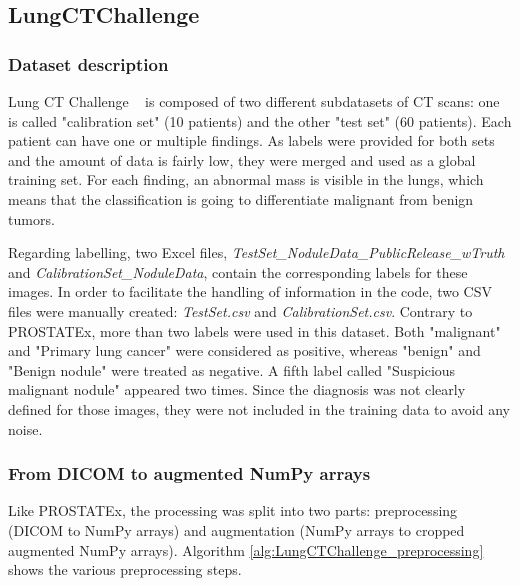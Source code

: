 \subsection{LungCTChallenge}
\label{sec:lungCTChallenge}
\subsubsection{Dataset description}
\setlength{\marginparwidth}{3cm}\leavevmode {}Lung CT Challenge ~\cite{12, 36, 38} is composed of two different subdatasets of CT scans: one is called "calibration set" (10 patients) and the other "test set" (60 patients). Each patient can have one or multiple findings. As labels were provided for both sets and the amount of data is fairly low, they were merged and used as a global training set. For each finding, an abnormal mass is visible in the lungs, which means that the classification is going to differentiate malignant from benign tumors.

Regarding labelling, two Excel files, \textit{TestSet\_NoduleData\_PublicRelease\_wTruth} and \textit{CalibrationSet\_NoduleData}, contain the corresponding labels for these images. In order to facilitate the handling of information in the code, two CSV files were manually created: \mbox{\textit{TestSet.csv}} and \textit{CalibrationSet.csv}.
Contrary to PROSTATEx, more than two labels were used in this dataset. Both "malignant" and "Primary lung cancer" were considered as positive, whereas "benign" and "Benign nodule" were treated as negative. A fifth label called "Suspicious malignant nodule" appeared two times. Since the diagnosis was not clearly defined for those images, they were not included in the training data to avoid any noise. 


\subsubsection{From DICOM to augmented NumPy arrays}
\setlength{\marginparwidth}{3cm}\leavevmode {}Like PROSTATEx, the processing was split into two parts: preprocessing (DICOM to NumPy arrays) and augmentation (NumPy arrays to cropped augmented NumPy arrays). Algorithm \ref{alg:LungCTChallenge_preprocessing} shows the various preprocessing steps.

